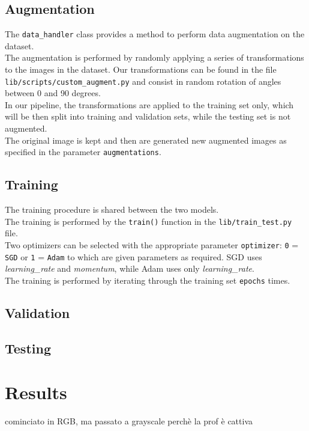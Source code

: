 \documentclass{report}
\begin{document}
\section{Augmentation}
The \texttt{data\_handler} class provides a method to perform data augmentation on the dataset. \\
The augmentation is performed by randomly applying a series of transformations to the images in the dataset. Our transformations can be found in the file \texttt{lib/scripts/custom\_augment.py} and 
consist in random rotation of angles between 0 and 90 degrees.\\

In our pipeline, the transformations are applied to the training set only, which will be then split into training and validation sets, while the testing set is not augmented. \\
The original image is kept and then are generated new augmented images as specified in the parameter \texttt{augmentations}.\\

\section{Training}
The training procedure is shared between the two models. \\
The training is performed by the \texttt{train()} function in the \texttt{lib/train\_test.py} file. \\

Two optimizers can be selected with the appropriate parameter \texttt{optimizer}: \texttt{0} = \texttt{SGD} or \texttt{1} = \texttt{Adam} to which are given parameters
as required. SGD uses \textit{learning\_rate} and \textit{momentum}, while Adam uses only \textit{learning\_rate}. \\
The training is performed by iterating through the training set \texttt{epochs} times. \\


\section{Validation}
\section{Testing}

\chapter{Results}
cominciato in RGB, ma passato a grayscale perchè la prof è cattiva
\end{document}
